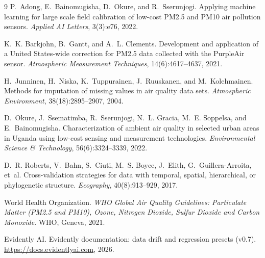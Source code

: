 \documentclass[11pt,a4paper]{article}
\begin{document}
\begin{thebibliography}{9}
P.~Adong, E.~Bainomugisha, D.~Okure, and R.~Sserunjogi.
\newblock Applying machine learning for large scale field calibration of low-cost PM2.5 and PM10 air pollution sensors.
\newblock \emph{Applied AI Letters}, 3(3):e76, 2022.

K.~K. Barkjohn, B.~Gantt, and A.~L. Clements.
\newblock Development and application of a United States-wide correction for PM2.5 data collected with the PurpleAir sensor.
\newblock \emph{Atmospheric Measurement Techniques}, 14(6):4617--4637, 2021.

H.~Junninen, H.~Niska, K.~Tuppurainen, J.~Ruuskanen, and M.~Kolehmainen.
\newblock Methods for imputation of missing values in air quality data sets.
\newblock \emph{Atmospheric Environment}, 38(18):2895--2907, 2004.

D.~Okure, J.~Ssematimba, R.~Sserunjogi, N.~L. Gracia, M.~E. Soppelsa, and E.~Bainomugisha.
\newblock Characterization of ambient air quality in selected urban areas in Uganda using low-cost sensing and measurement technologies.
\newblock \emph{Environmental Science \& Technology}, 56(6):3324--3339, 2022.

D.~R. Roberts, V.~Bahn, S.~Ciuti, M.~S. Boyce, J.~Elith, G.~Guillera-Arroita, et~al.
\newblock Cross-validation strategies for data with temporal, spatial, hierarchical, or phylogenetic structure.
\newblock \emph{Ecography}, 40(8):913--929, 2017.

World Health Organization.
\newblock \emph{WHO Global Air Quality Guidelines: Particulate Matter (PM2.5 and PM10), Ozone, Nitrogen Dioxide, Sulfur Dioxide and Carbon Monoxide}.
\newblock WHO, Geneva, 2021.

Evidently AI.
\newblock Evidently documentation: data drift and regression presets (v0.7).
\newblock \url{https://docs.evidentlyai.com}, 2026.
\end{thebibliography}
\end{document}
